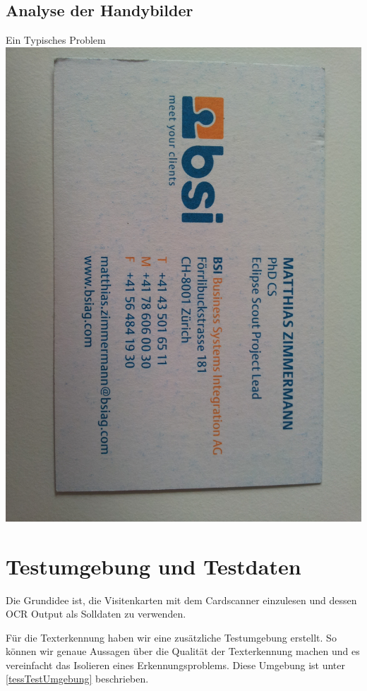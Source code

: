 \documentclass[10pt]{article}
\begin{document}
\subsection{Analyse der Handybilder}
Ein Typisches Problem
\includegraphics[scale= 0.05]{MZimmermann.jpg}


\section{Testumgebung und Testdaten}

Die Grundidee ist, die Visitenkarten mit dem Cardscanner einzulesen und dessen OCR Output als Solldaten zu verwenden. 

Für die Texterkennung haben wir eine zusätzliche Testumgebung erstellt. So können wir genaue Aussagen über die Qualität der Texterkennung machen und es vereinfacht das Isolieren eines Erkennungsproblems. Diese Umgebung ist unter \ref{tessTestUmgebung} beschrieben.
 
\end{document}
